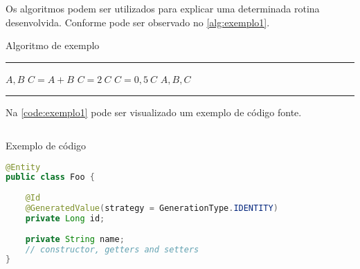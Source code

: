 Os algoritmos podem ser utilizados para explicar uma determinada rotina desenvolvida. Conforme pode ser observado no \autoref{alg:exemplo1}.

\begin{algorithm}[htb]
	\caption{Algoritmo de exemplo}
	\label{alg:exemplo1}
	\hrule
	\begin{algorithmic}[1]
		\ENSURE $A, B$
		\STATE $C = A + B$
		\STATE $C = 2 \ C$
		\ELSE
		\STATE $C = 0,5 \ C$
		\ENDIF
		\PRINT $A, B, C$
	\end{algorithmic}
	\hrule
	\fonte{}
\end{algorithm}

\lipsum[1]

\lipsum[1]

Na \autoref{code:exemplo1} pode ser visualizado um exemplo de código fonte.

\begin{sourcecode}[htb]
	\caption{\label{code:exemplo1}Exemplo de código}
	\begin{lstlisting}[frame=single, language=Java]
@Entity
public class Foo {
 
    @Id
    @GeneratedValue(strategy = GenerationType.IDENTITY)
    private Long id;
 
    private String name;
    // constructor, getters and setters
}
\end{lstlisting}
	\fonte{}
\end{sourcecode}

